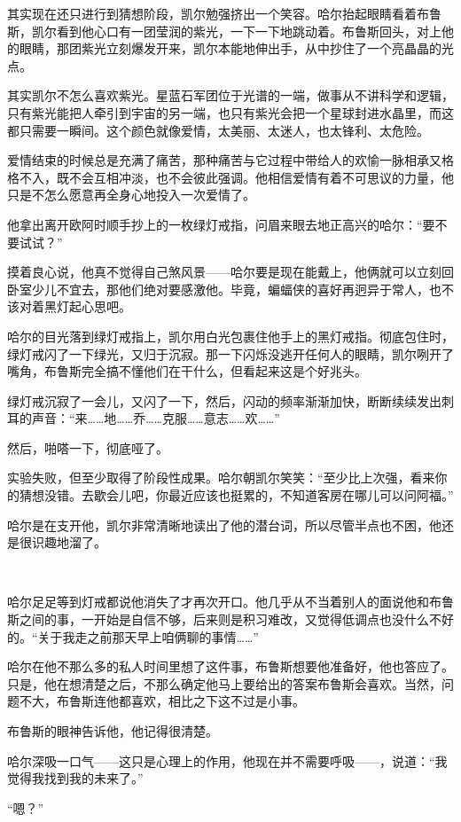 \documentclass[../main]{subfiles}
\begin{document}
其实现在还只进行到猜想阶段，凯尔勉强挤出一个笑容。哈尔抬起眼睛看着布鲁斯，凯尔看到他心口有一团莹润的紫光，一下一下地跳动着。布鲁斯回头，对上他的眼睛，那团紫光立刻爆发开来，凯尔本能地伸出手，从中抄住了一个亮晶晶的光点。

其实凯尔不怎么喜欢紫光。星蓝石军团位于光谱的一端，做事从不讲科学和逻辑，只有紫光能把人牵引到宇宙的另一端，也只有紫光会把一个星球封进水晶里，而这都只需要一瞬间。这个颜色就像爱情，太美丽、太迷人，也太锋利、太危险。

爱情结束的时候总是充满了痛苦，那种痛苦与它过程中带给人的欢愉一脉相承又格格不入，既不会互相冲淡，也不会彼此强调。他相信爱情有着不可思议的力量，他只是不怎么愿意再全身心地投入一次爱情了。

他拿出离开欧阿时顺手抄上的一枚绿灯戒指，问眉来眼去地正高兴的哈尔：“要不要试试？”

摸着良心说，他真不觉得自己煞风景——哈尔要是现在能戴上，他俩就可以立刻回卧室少儿不宜去，那他们绝对要感激他。毕竟，蝙蝠侠的喜好再迥异于常人，也不该对着黑灯起心思吧。

哈尔的目光落到绿灯戒指上，凯尔用白光包裹住他手上的黑灯戒指。彻底包住时，绿灯戒闪了一下绿光，又归于沉寂。那一下闪烁没逃开任何人的眼睛，凯尔咧开了嘴角，布鲁斯完全搞不懂他们在干什么，但看起来这是个好兆头。

绿灯戒沉寂了一会儿，又闪了一下，然后，闪动的频率渐渐加快，断断续续发出刺耳的声音：“来……地……乔……克服……意志……欢……”

然后，啪嗒一下，彻底哑了。

实验失败，但至少取得了阶段性成果。哈尔朝凯尔笑笑：“至少比上次强，看来你的猜想没错。去歇会儿吧，你最近应该也挺累的，不知道客房在哪儿可以问阿福。”

哈尔是在支开他，凯尔非常清晰地读出了他的潜台词，所以尽管半点也不困，他还是很识趣地溜了。

~\

哈尔足足等到灯戒都说他消失了才再次开口。他几乎从不当着别人的面说他和布鲁斯之间的事，一开始是自信不够，后来则是积习难改，又觉得低调点也没什么不好的。“关于我走之前那天早上咱俩聊的事情……”

哈尔在他不那么多的私人时间里想了这件事，布鲁斯想要他准备好，他也答应了。只是，他在想清楚之后，不那么确定他马上要给出的答案布鲁斯会喜欢。当然，问题不大，布鲁斯连他都喜欢，相比之下这不过是小事。

布鲁斯的眼神告诉他，他记得很清楚。

哈尔深吸一口气——这只是心理上的作用，他现在并不需要呼吸——，说道：“我觉得我找到我的未来了。”

“嗯？”
\end{document}
